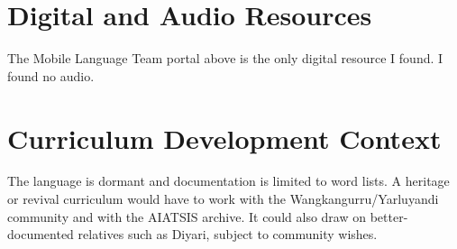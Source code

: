 \documentclass[12pt]{article}
\begin{document}
\section{Digital and Audio Resources}
The Mobile Language Team portal above is the only digital resource I found. I found no audio.

\section{Curriculum Development Context}
The language is dormant and documentation is limited to word lists. A heritage or revival curriculum would have to work with the Wangkangurru/Yarluyandi community and with the AIATSIS archive. It could also draw on better-documented relatives such as Diyari, subject to community wishes.
\end{document}
